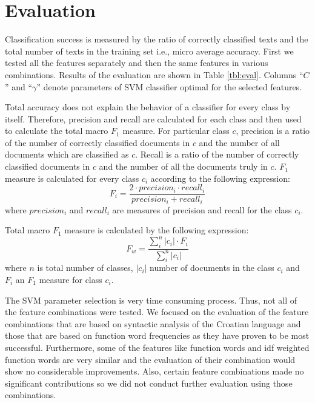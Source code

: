 \documentclass{llncs}
\begin{document}
\section{Evaluation}
\label{sec:evaluacija}
Classification success is measured by the ratio of correctly classified texts and
the total number of texts in the training set i.e., micro average accuracy.
First we tested all the features separately and then the same features in
various combinations. Results of the evaluation
are shown in Table \ref{tbl:eval}. Columns ``$C$'' and ``$\gamma$'' denote
parameters of SVM classifier optimal for the selected features.

Total accuracy does not explain the behavior of a classifier for every class by
itself. Therefore, precision and recall are calculated for each class and then
used to calculate the total macro $F_1$ measure. For particular class $c$,
precision is a ratio of the number of correctly classified documents in $c$ and
the number of all documents which are classified as $c$. Recall is a ratio of the
number of correctly classified documents in $c$ and the number of all the
documents truly in $c$. $F_1$ measure is calculated for every class $c_i$
according to the following expression:
\begin{equation}
F_i = \frac{2 \cdot precision_i \cdot recall_i}{precision_i + recall_i}
\end{equation}
where $precision_i$ and $recall_i$ are measures of precision and recall for
the class $c_i$.

Total macro $F_1$ measure is calculated by the following expression:
\begin{equation}
F_w = \frac{\sum^{n}_i |c_i|\cdot F_i}{\sum^n_i|c_i|}
\end{equation}
where $n$ is total number of classes, $|c_i|$ number of documents in the class
$c_i$ and $F_i$ an $F_1$ measure for class $c_i$.

The SVM parameter selection is very time consuming process. Thus, not all of the
feature combinations were tested. We focused on the evaluation of the feature
combinations that are based on syntactic analysis of the Croatian language and
those that are based on function word frequencies as they have proven to be most
successful. Furthermore, some of the features like function words and idf
weighted function words are very similar and the evaluation of their combination
would show no considerable improvements. Also, certain feature combinations made
no significant contributions so we did not conduct further evaluation using
those combinations.
\end{document}

